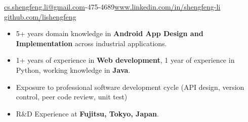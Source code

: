 \documentclass[10pt,a4paper]{article}
\begin{document}
\sloppy  %



\nobreakvspace{0.3em}  %

\noindent\href{mailto:cs.shengfeng.li@gmail.com}{cs.shengfeng.li@gmail.com}-475-4689\sbull\href{https://www.linkedin.com/in/shengfeng-li/}{www.linkedin.com/in/shengfeng-li}\sbull
\href{https://github.com/lishengfeng}{github.com/lishengfeng}

\spacedhrule{0.5em}{-0.8em}  %
\begin{itemize}
\setlength{\itemsep}{0.1em}
\item 5+ years domain knowledge in \textbf{Android App Design and Implementation} across industrial applications. 
\item 1+ years of experience in \textbf{Web development}, 1 year of experience in Python, working knowledge in
  \textbf{Java}.
 \item Exposure to professional software development cycle (API design, version control, peer code review, unit test) 
\item  R\&D Experience at \textbf{Fujitsu, Tokyo, Japan}.
\end{itemize}


\end{document}
